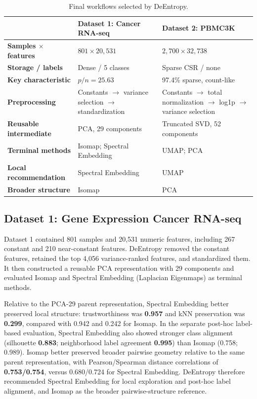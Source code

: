 \documentclass[10pt]{article}
\begin{document}
\begin{table}[h!]
\centering
\caption{Final workflows selected by DeEntropy.}
\label{tab:workflows}
\small
\begin{tabularx}{\textwidth}{>{\bfseries}p{}XX}
\toprule
 & Dataset 1: Cancer RNA-seq & Dataset 2: PBMC3K \\
\midrule
Samples $\times$ features
    & $801\times20{,}531$
    & $2{,}700\times32{,}738$ \\
Storage / labels
    & Dense / 5 classes
    & Sparse CSR / none \\
Key characteristic
    & $p/n=25.63$
    & 97.4\% sparse, count-like \\
Preprocessing
    & Constants $\rightarrow$ variance selection $\rightarrow$ standardization
    & Constants $\rightarrow$ total normalization $\rightarrow$ log1p
      $\rightarrow$ variance selection \\
Reusable intermediate
    & PCA, 29 components
    & Truncated SVD, 52 components \\
Terminal methods
    & Isomap; Spectral Embedding
    & UMAP; PCA \\
Local recommendation
    & Spectral Embedding
    & UMAP \\
Broader structure
    & Isomap
    & PCA \\
\bottomrule
\end{tabularx}
\end{table}

\subsection{Dataset 1: Gene Expression Cancer RNA-seq}

Dataset 1 contained 801 samples and 20,531 numeric features, including 267
constant and 210 near-constant features. DeEntropy removed the constant
features, retained the top 4,056 variance-ranked features, and standardized
them. It then constructed a reusable PCA representation with 29 components
\cite{jolliffe2016} and evaluated Isomap \cite{tenenbaum2000} and Spectral
Embedding (Laplacian Eigenmaps) \cite{belkin2003} as terminal methods.

Relative to the PCA-29 parent representation, Spectral Embedding better
preserved local structure: trustworthiness was \textbf{0.957} and kNN
preservation was \textbf{0.299}, compared with 0.942 and 0.242 for Isomap.
In the separate post-hoc label-based evaluation, Spectral Embedding also showed
stronger class alignment (silhouette \textbf{0.883}; neighborhood label
agreement \textbf{0.995}) than Isomap (0.758; 0.989). Isomap better preserved
broader pairwise geometry relative to the same parent representation, with
Pearson/Spearman distance correlations of \textbf{0.753/0.754}, versus
0.680/0.724 for Spectral Embedding. DeEntropy therefore recommended Spectral
Embedding for local exploration and post-hoc label alignment, and Isomap as
the broader pairwise-structure reference.
\end{document}
